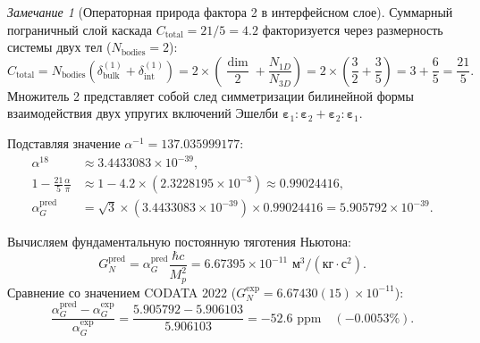 \documentclass[11pt,a4paper]{article}
\theoremstyle{definition}
\theoremstyle{remark}
\newtheorem{remark}{Замечание}
\begin{document}
\begin{remark}[Операторная природа фактора 2 в интерфейсном слое]
	Суммарный пограничный слой каскада $C_{\mathrm{total}} = 21/5 = 4.2$ факторизуется через размерность системы двух тел ($N_{\mathrm{bodies}} = 2$):
	\begin{equation}
		C_{\mathrm{total}} = N_{\mathrm{bodies}} \left( \delta_{\mathrm{bulk}}^{(1)} + \delta_{\mathrm{int}}^{(1)} \right) = 2 \times \left( \frac{\dim}{2} + \frac{N_{1D}}{N_{3D}} \right) = 2 \times \left( \frac{3}{2} + \frac{3}{5} \right) = 3 + \frac{6}{5} = \frac{21}{5}.
	\end{equation}
	Множитель 2 представляет собой след симметризации билинейной формы взаимодействия двух упругих включений Эшелби $\boldsymbol{\varepsilon}_1 : \boldsymbol{\varepsilon}_2 + \boldsymbol{\varepsilon}_2 : \boldsymbol{\varepsilon}_1$.
\end{remark}

Подставляя значение $\alpha^{-1} = 137.035999177$:
\begin{align}
	\alpha^{18} &\approx 3.4433083 \times 10^{-39}, \\
	1 - \frac{21}{5}\frac{\alpha}{\pi} &\approx 1 - 4.2 \times (2.3228195 \times 10^{-3}) \approx 0.99024416, \\
	\alpha_G^{\mathrm{pred}} &= \sqrt{3} \times (3.4433083 \times 10^{-39}) \times 0.99024416 = 5.905792 \times 10^{-39}.
\end{align}

Вычисляем фундаментальную постоянную тяготения Ньютона:
\begin{equation}
	G_N^{\mathrm{pred}} = \alpha_G^{\mathrm{pred}} \frac{\hbar c}{M_p^2} = 6.67395 \times 10^{-11}\text{ м}^3/(\text{кг}\cdot\text{с}^2).
	\label{eq:GN_predicted_value}
\end{equation}
Сравнение со значением CODATA 2022 ($G_N^{\mathrm{exp}} = 6.67430(15) \times 10^{-11}$):
\begin{equation}
	\frac{\alpha_G^{\mathrm{pred}} - \alpha_G^{\mathrm{exp}}}{\alpha_G^{\mathrm{exp}}} = \frac{5.905792 - 5.906103}{5.906103} = -52.6\text{ ppm} \quad (-0.0053\%).
\end{equation}
\end{document}
